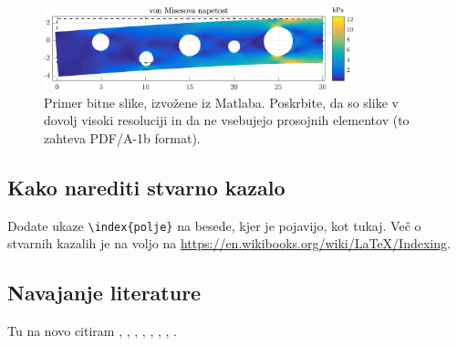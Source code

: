 \documentclass[12pt,a4paper,twoside]{article}
\theoremstyle{definition} %
\theoremstyle{plain} %
\numberwithin{equation}{section}  %
\begin{document}
\begin{figure}[h]
  \centering
  \includegraphics[width=0.8\textwidth]{images/image.png}
  \caption[Primer bitne slike.]{Primer bitne slike, izvožene iz Matlaba. Poskrbite, da so slike v
  dovolj visoki resoluciji in da ne vsebujejo prosojnih elementov (to zahteva PDF/A-1b format).}
  \label{fig:image}
\end{figure}

\subsection{Kako narediti stvarno kazalo}
Dodate ukaze \verb|\index{polje}| na besede, kjer je pojavijo, kot tukaj.
Več o stvarnih kazalih je na voljo na \url{https://en.wikibooks.org/wiki/LaTeX/Indexing}.

\subsection{Navajanje literature}

Tu na novo citiram \cite{DPHclanek1}, \cite{DPHclanek2}, \cite{beltranmonterde}, \cite{choi2002clifford},
\cite{struik1961lectures}, \cite{kreyszig2019differential}, \cite{faroukietal2004}, \cite{farouki2008pythagorean}. 
\end{document}

